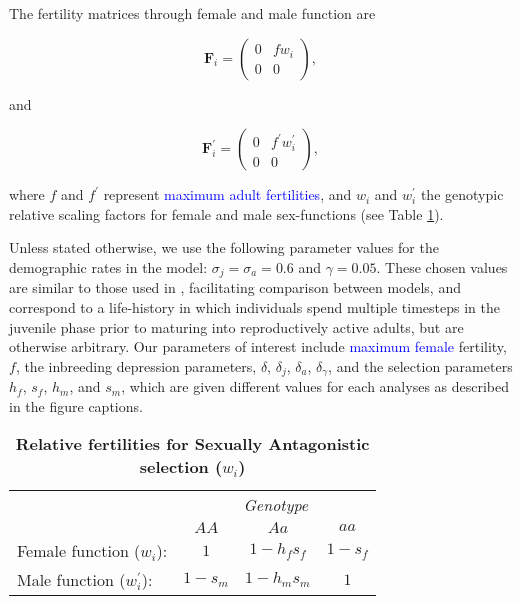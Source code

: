 \documentclass[11pt]{article}
\def\mbf#1{\mathbf{#1}}
\begin{document}
The fertility matrices through female and male function are
\begin{linenomath*}
\begin{equation}\label{eq:F_female}
	\mbf{F}_{i} = \left(
					\begin{array}{cc}
						0 & f w_{i} \\
						0 & 0
					\end{array}
				\right),
\end{equation}
\end{linenomath*}
\noindent and
\begin{linenomath*}
\begin{equation}\label{eq:F_male}
	\mbf{F}^{\prime}_{i} = \left(
					\begin{array}{cc}
						0 & f^{\prime} w^{\prime}_{i} \\
						0 & 0
					\end{array}
				\right),
\end{equation}
\end{linenomath*}

\noindent where $f$ and $f^{\prime}$ represent \textcolor{blue}{maximum adult fertilities}, and $w_{i}$ and $w^{\prime}_{i}$ the genotypic relative scaling factors for female and male sex-functions (see Table \ref{tab:Fitness}). 

Unless stated otherwise, we use the following parameter values for the demographic rates in the model: $\sigma_j = \sigma_a = 0.6$ and $\gamma = 0.05$. These chosen values are similar to those used in \citet{deVriesCaswell2019b}, facilitating comparison between models, and correspond to a life-history in which individuals spend multiple timesteps in the juvenile phase prior to maturing into reproductively active adults, but are otherwise arbitrary. Our parameters of interest include \textcolor{blue}{maximum female} fertility, $f$, the inbreeding depression parameters, $\delta$, $\delta_j$, $\delta_a$, $\delta_{\gamma}$, and the selection parameters $h_f$, $s_f$, $h_m$, and $s_m$, which are given different values for each analyses as described in the figure captions. 

\begin{table}[htbp]
 \centering
 \caption{\bf Relative fertilities for Sexually Antagonistic selection ($w_{i}$)}
\label{tab:Fitness}
\begin{tabular}{lccc}
 \toprule
					&  \multicolumn{3}{c}{{\textit{Genotype}}} \\ 
\cline{2-4}
					& $AA$			& $Aa$ 					& $aa$ 		\\ \hline
Female function ($w_{i}$):	& $1$		& $1 - h_f s_f$	& $1 - s_f$ \\	
Male function ($w^{\prime}_{i}$):		& $1 - s_m$& $1 - h_m s_m$	& $1$ 		\\	
\hline
\end{tabular}
\end{table}
\end{document}
